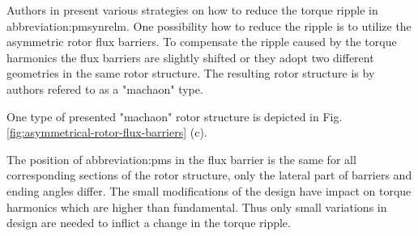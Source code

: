 \documentclass[a4paper, twoside, 11pt]{article}
\begin{document}
    Authors in \cite{bianchi-Experimental-comparison-of-PM-assisted-synchronous-reluctance-motors} present various strategies on how to reduce the torque ripple in \gls{abbreviation:pmsynrelm}. One possibility how to reduce the ripple is to utilize the asymmetric rotor flux barriers. To compensate the ripple caused by the torque harmonics the flux barriers are slightly shifted or they adopt two different geometries in the same rotor structure. The resulting rotor structure is by authors refered to as a "machaon" type.\par
    One type of presented "machaon" rotor structure is depicted in Fig. \ref{fig:asymmetrical-rotor-flux-barriers} (c).\par
    The position of \gls{abbreviation:pm}s in the flux barrier is the same for all corresponding sections of the rotor structure, only the lateral part of barriers and ending angles differ. The small modifications of the design have impact on torque harmonics which are higher than fundamental. Thus only small variations in design are needed to inflict a change in the torque ripple. \cite{bianchi-Experimental-comparison-of-PM-assisted-synchronous-reluctance-motors}\par
\end{document}
